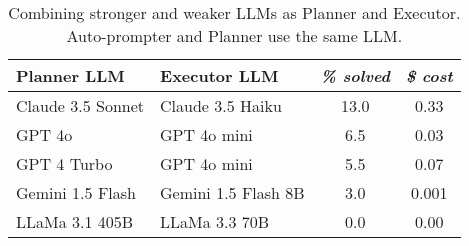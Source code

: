 \begin{table}[htbp]
    \centering
    \caption{Combining stronger and weaker LLMs as Planner and Executor. Auto-prompter and Planner use the same LLM.}
    \begin{tabular}{llcc}
        \toprule
        \textbf{Planner LLM} & \textbf{Executor LLM} & \textit{\% solved} & \textit{\$ cost} \\
        \midrule
        Claude 3.5 Sonnet & Claude 3.5 Haiku     & 13.0 & 0.33 \\
        GPT 4o & GPT 4o mini                     & 6.5 & 0.03 \\
        GPT 4 Turbo & GPT 4o mini                & 5.5 & 0.07 \\
        Gemini 1.5 Flash & Gemini 1.5 Flash 8B   & 3.0 & 0.001 \\
        LLaMa 3.1 405B & LLaMa 3.3 70B           & 0.0 & 0.00 \\
        \bottomrule
    \end{tabular}
    \label{tab:mix_model}
\end{table}